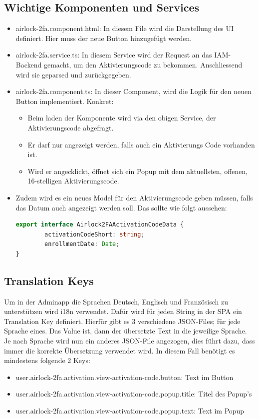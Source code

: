 \subsection{Wichtige Komponenten und Services}
\begin{itemize}
	\item airlock-2fa.component.html: In diesem File wird die Darstellung des UI definiert. Hier muss der neue Button hinzugefügt werden.
	\item airlock-2fa.service.ts: In diesem Service wird der Request an das IAM-Backend gemacht, um den Aktivierungscode zu bekommen. Anschliessend wird sie geparsed und zurückgegeben.
	\item airlock-2fa.component.ts: In dieser Component, wird die Logik für den neuen Button implementiert. Konkret:
	\begin{itemize}
		\item Beim laden der Komponente wird via den obigen Service, der Aktivierungscode abgefragt.  
		\item Er darf nur angezeigt werden, falls auch ein Aktivierungs Code vorhanden ist.
		\item Wird er angecklickt, öffnet sich ein Popup mit dem aktuellsten, offenen, 16-stelligen Aktivierungscode.
	\end{itemize}
	\item Zudem wird es ein neues Model für den Aktivierungscode geben müssen, falls das Datum auch angezeigt werden soll. Das sollte wie folgt aussehen:
		\begin{lstlisting}[language=TypeScript]
export interface Airlock2FAActivationCodeData {
		activationCodeShort: string;
		enrollmentDate: Date;
}
		\end{lstlisting}
\end{itemize}
\subsection{Translation Keys}
Um in der Adminapp die Sprachen Deutsch, Englisch und Französisch zu unterstützen wird i18n verwendet. Dafür wird für jeden String in der SPA ein Translation Key definiert. Hierfür gibt es 3 verschiedene JSON-Files; für jede Sprache eines. Das Value ist, dann der übersetzte Text in die jeweilige Sprache. Je nach Sprache wird nun ein anderes JSON-File angezogen, dies führt dazu, dass immer die korrekte Übersetzung verwendet wird. In diesem Fall benötigt es mindestens folgende 2 Keys:
\begin{itemize}
	\item user.airlock-2fa.activation.view-activation-code.button: Text im Button
	\item user.airlock-2fa.activation.view-activation-code.popup.title: Titel des Popup's
	\item user.airlock-2fa.activation.view-activation-code.popup.text: Text im Popup
\end{itemize}

